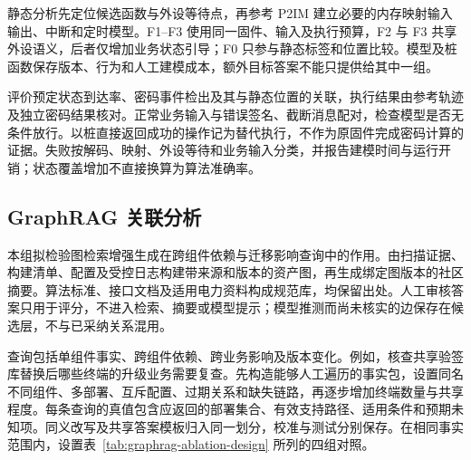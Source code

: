 静态分析先定位候选函数与外设等待点，再参考 P2IM 建立必要的内存映射输入输出、中断和定时模型\cite{p2im2020}。F1--F3 使用同一固件、输入及执行预算，F2 与 F3 共享外设语义，后者仅增加业务状态引导；F0 只参与静态标签和位置比较。模型及桩函数保存版本、行为和人工建模成本，额外目标答案不能只提供给其中一组。

评价预定状态到达率、密码事件检出及其与静态位置的关联，执行结果由参考轨迹及独立密码结果核对。正常业务输入与错误签名、截断消息配对，检查模型是否无条件放行。以桩直接返回成功的操作记为替代执行，不作为原固件完成密码计算的证据。失败按解码、映射、外设等待和业务输入分类，并报告建模时间与运行开销；状态覆盖增加不直接换算为算法准确率。


\subsection{GraphRAG 关联分析}
\label{subsec:graphrag-experiment}

本组拟检验图检索增强生成在跨组件依赖与迁移影响查询中的作用。由扫描证据、构建清单、配置及受控日志构建带来源和版本的资产图，再生成绑定图版本的社区摘要\cite{graphrag2024}。算法标准、接口文档及适用电力资料构成规范库，均保留出处。人工审核答案只用于评分，不进入检索、摘要或模型提示；模型推测而尚未核实的边保存在候选层，不与已采纳关系混用。

查询包括单组件事实、跨组件依赖、跨业务影响及版本变化。例如，核查共享验签库替换后哪些终端的升级业务需要复查。先构造能够人工遍历的事实包，设置同名不同组件、多部署、互斥配置、过期关系和缺失链路，再逐步增加终端数量与共享程度。每条查询的真值包含应返回的部署集合、有效支持路径、适用条件和预期未知项。同义改写及共享答案模板归入同一划分，校准与测试分别保存。在相同事实范围内，设置表~\ref{tab:graphrag-ablation-design} 所列的四组对照。

